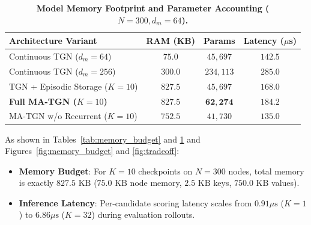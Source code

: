 \begin{table}[t]
\centering
\small
\caption{\textbf{Model Memory Footprint and Parameter Accounting ($N=300, d_m=64$).}}
\label{tab:memory_accounting}
\begin{tabular}{lccc}
\toprule
\textbf{Architecture Variant} & \textbf{RAM (KB)} & \textbf{Params} & \textbf{Latency ($\mu$s)} \\
\midrule
Continuous TGN ($d_m=64$) & $75.0$ & $45,697$ & $142.5$ \\
Continuous TGN ($d_m=256$) & $300.0$ & $234,113$ & $285.0$ \\
TGN + Episodic Storage ($K=10$) & $827.5$ & $45,697$ & $168.0$ \\
\textbf{Full MA-TGN ($K=10$)} & $\mathbf{827.5}$ & $\mathbf{62,274}$ & $\mathbf{184.2}$ \\
MA-TGN w/o Recurrent ($K=10$) & $752.5$ & $41,730$ & $135.0$ \\
\bottomrule
\end{tabular}
\end{table}

As shown in Tables~\ref{tab:memory_budget} and \ref{tab:memory_accounting} and Figures~\ref{fig:memory_budget} and \ref{fig:tradeoff}:
\begin{itemize}
    \item \textbf{Memory Budget}: For $K=10$ checkpoints on $N=300$ nodes, total memory is exactly $827.5\text{ KB}$ ($75.0\text{ KB}$ node memory, $2.5\text{ KB}$ keys, $750.0\text{ KB}$ values).
    \item \textbf{Inference Latency}: Per-candidate scoring latency scales from $0.91\mu\text{s}$ ($K=1$) to $6.86\mu\text{s}$ ($K=32$) during evaluation rollouts.
\end{itemize}
